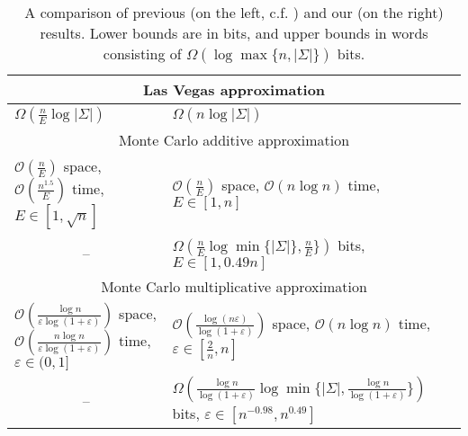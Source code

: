 \documentclass{article}[11pt,letter]
\newcommand{\bigo}{\mathcal{O}}
\newcommand{\aerr}{\ensuremath{E}}
\begin{document}
\newcommand{\tablebgcolor}{}
\newcommand{\tablebgcolordark}{}
\newcommand{\cellbgcolor}{}
\newcommand{\cellbgcolordark}{}

\begin{table}[t!]

\begin{tabular}{p{}p{}}
	\toprule		
		\multicolumn{2}{c}{Las Vegas approximation}\\
		\midrule
		$\Omega(\frac{n}{\aerr}\log|\Sigma|)$ & $\Omega(n\log|\Sigma|)$ \\
		\midrule
		\multicolumn{2}{c}{Monte Carlo additive approximation}\\
		\midrule
		$\bigo(\frac{n}{\aerr})$ space, $\bigo(\frac{n^{1.5}}{\aerr})$ time, $\aerr \in [1,\sqrt{n}]$ & $\bigo(\frac{n}{\aerr})$ space, $\bigo(n \log n)$ time, $\aerr \in [1,n]$\\
	
		\multicolumn{1}{c}{--} & $\Omega(\frac{n}{\aerr} \log \min\{ |\Sigma| \}, \frac{n}{\aerr} \})$ bits, $\aerr \in [1,0.49n]$ \\
		\midrule
		\multicolumn{2}{c}{Monte Carlo multiplicative approximation}\\
		\midrule
		$\bigo(\frac{\log n}{\varepsilon\log(1+\varepsilon)})$ space, $\bigo(\frac{n\log n}{\varepsilon \log(1+\varepsilon)})$ time, $\varepsilon \in (0,1]$ & $\bigo(\frac{\log(n\varepsilon)}{\log(1+\varepsilon)})$ space, $\bigo(n \log n)$ time, $\varepsilon \in [\frac2n,n]$\\

		\multicolumn{1}{c}{--} & $\Omega(\frac{\log n}{\log(1+\varepsilon)}\log \min \{|\Sigma|,\frac{\log n}{\log(1+\varepsilon)}\})$ bits, $\varepsilon \in [n^{-0.98}, n^{0.49}]$\\
		\bottomrule
	\end{tabular}
	\caption{
    A comparison of previous (on the left, c.f. \cite{Berenbrink}) and our (on the right) results. Lower bounds are in bits, and upper bounds in words consisting of $\Omega(\log \max\{ n,|\Sigma|\})$ bits.
\label{table:results}
}

\end{table}
\end{document}
